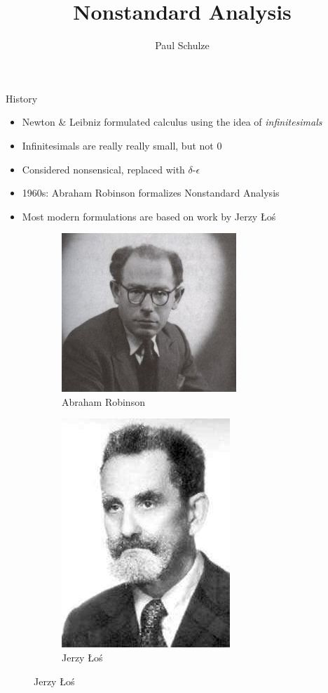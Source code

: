 \documentclass{beamer}
\title{Nonstandard Analysis}
\author{Paul Schulze}
\date{}
\theoremstyle{plain}
\theoremstyle{definition}
\begin{document}
	
\begin{frame}
	\titlepage
\end{frame}
	
	
\begin{frame}{History}
	\begin{itemize}
		\item Newton \& Leibniz formulated calculus using the idea of \textit{infinitesimals}
		\item Infinitesimals are really really small, but not $0$
		\item Considered nonsensical, replaced with $\delta$-$\epsilon$
		\item 1960s: Abraham Robinson formalizes Nonstandard Analysis
		\item Most modern formulations are based on work by Jerzy \L o\'s
	\end{itemize}
	\begin{figure}[h]
		\begin{subfigure}{0.4\textwidth}
			\centering
			\includegraphics[width=0.6\linewidth]{Robinson}
			\caption{Abraham Robinson}
		\end{subfigure}
		\begin{subfigure}{0.4\textwidth}
			\centering
			\includegraphics[width=0.4\linewidth]{Los}
			\caption{Jerzy \L o\'s}
		\end{subfigure}
	\end{figure}
\end{frame}
\end{document}
